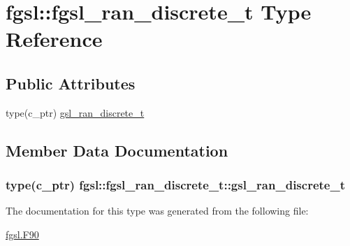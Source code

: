 \hypertarget{structfgsl_1_1fgsl__ran__discrete__t}{\section{fgsl\-:\-:fgsl\-\_\-ran\-\_\-discrete\-\_\-t Type Reference}
\label{structfgsl_1_1fgsl__ran__discrete__t}
}
\subsection*{Public Attributes}
\begin{DoxyCompactItemize}
\item 
type(c\-\_\-ptr) \hyperlink{structfgsl_1_1fgsl__ran__discrete__t_ae63ca57e21d5ecf4d68f34a65a43141f}{gsl\-\_\-ran\-\_\-discrete\-\_\-t}
\end{DoxyCompactItemize}


\subsection{Member Data Documentation}
\hypertarget{structfgsl_1_1fgsl__ran__discrete__t_ae63ca57e21d5ecf4d68f34a65a43141f}{
\subsubsection[{gsl\-\_\-ran\-\_\-discrete\-\_\-t}]{\setlength{\rightskip}{0pt plus 5cm}type(c\-\_\-ptr) fgsl\-::fgsl\-\_\-ran\-\_\-discrete\-\_\-t\-::gsl\-\_\-ran\-\_\-discrete\-\_\-t}}\label{structfgsl_1_1fgsl__ran__discrete__t_ae63ca57e21d5ecf4d68f34a65a43141f}


The documentation for this type was generated from the following file\-:\begin{DoxyCompactItemize}
\item 
\hyperlink{fgsl_8F90}{fgsl.\-F90}\end{DoxyCompactItemize}
